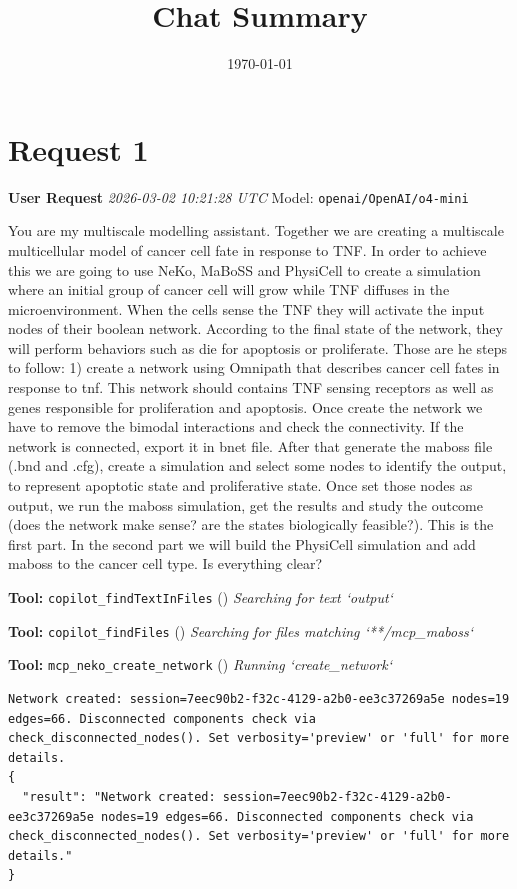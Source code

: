 \documentclass[11pt,a4paper]{article}
\title{Chat Summary}
\date{\today}
\begin{document}
\maketitle
\tableofcontents
\newpage

\section{Request 1}
\begin{userbox}
\textbf{User Request}
\quad \textit{2026-03-02 10:21:28 UTC}
\quad Model: \texttt{openai/OpenAI/o4-mini}

You are my multiscale modelling assistant. Together we are creating a multiscale multicellular model of cancer cell fate in response to TNF. In order to achieve this we are going to use NeKo, MaBoSS and PhysiCell to create a simulation where an initial group of cancer cell will grow while TNF diffuses in the microenvironment. When the cells sense the TNF they will activate the input nodes of their boolean network. According to the final state of the network, they will perform behaviors such as die for apoptosis or proliferate. Those are he steps to follow: 1) create a network using Omnipath that describes cancer cell fates in response to tnf. This network should contains TNF sensing receptors as well as genes responsible for proliferation and apoptosis. Once create the network we have to remove the bimodal interactions and check the connectivity. If the network is connected, export it in bnet file. After that generate the maboss file (.bnd and .cfg), create a simulation and select some nodes to identify the output, to represent apoptotic state and proliferative state. Once set those nodes as output, we run the maboss simulation, get the results and study the outcome (does the network make
sense? are the states biologically feasible?). This is the first part. In the second part we will build the PhysiCell simulation and add maboss to the cancer cell type. Is everything clear?

\end{userbox}
\begin{toolokbox}
\textbf{Tool:} \texttt{copilot\_findTextInFiles} (\checkmark)
\textit{Searching for text `output`}
\end{toolokbox}
\begin{toolokbox}
\textbf{Tool:} \texttt{copilot\_findFiles} (\checkmark)
\textit{Searching for files matching `**/mcp\_maboss`}
\end{toolokbox}
\begin{toolokbox}
\textbf{Tool:} \texttt{mcp\_neko\_create\_network} (\checkmark)
\textit{Running `create\_network`}
\begin{lstlisting}
Network created: session=7eec90b2-f32c-4129-a2b0-ee3c37269a5e nodes=19 edges=66. Disconnected components check via check_disconnected_nodes(). Set verbosity='preview' or 'full' for more details.
{
  "result": "Network created: session=7eec90b2-f32c-4129-a2b0-ee3c37269a5e nodes=19 edges=66. Disconnected components check via check_disconnected_nodes(). Set verbosity='preview' or 'full' for more details."
}
\end{lstlisting}
\end{toolokbox}
\end{document}
